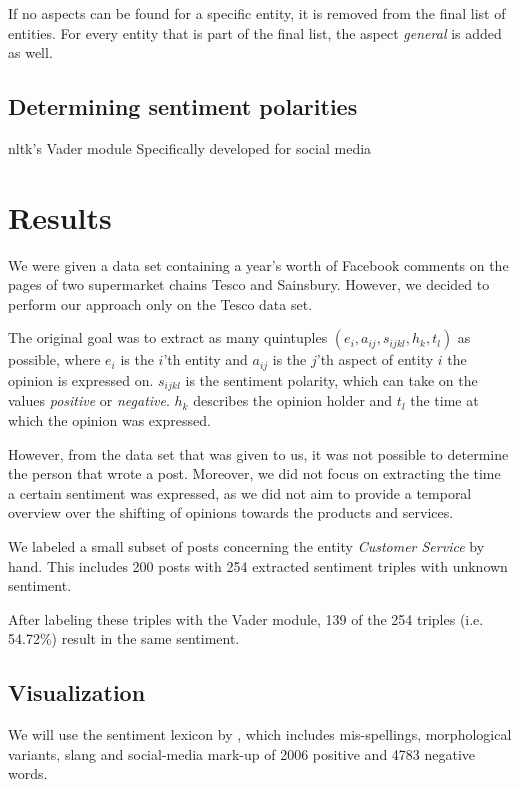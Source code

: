 \documentclass[10pt,a4paper]{article}
\begin{document}
		If no aspects can be found for a specific entity, it is removed from the final list of entities.
		For every entity that is part of the final list, the aspect \textit{general} is added as well.

		\subsection{Determining sentiment polarities}
		nltk's Vader module
		Specifically developed for social media

	\section{Results}
	\label{sec:results}
	
	
	We were given a data set containing a year's worth of Facebook comments on the pages of two supermarket chains Tesco and Sainsbury. However, we decided to perform our approach only on the Tesco data set.

	The original goal was to extract as many quintuples $(e_i, a_{ij}, s_{ijkl}, h_k, t_l)$ as possible, where $e_i$ is the $i$'th entity and $a_{ij}$ is the $j$'th aspect of entity $i$ the opinion is expressed on. $s_{ijkl}$ is the sentiment polarity, which can take on the values \textit{positive} or \textit{negative}. $h_k$ describes the opinion holder and $t_l$ the time at which the opinion was expressed.

	However, from the data set that was given to us, it was not possible to determine the person that wrote a post. Moreover, we did not focus on extracting the time a certain sentiment was expressed, as we did not aim to provide a temporal overview over the shifting of opinions towards the products and services.

	We labeled a small subset of posts concerning the entity \textit{Customer Service} by hand. This includes 200 posts with 254 extracted sentiment triples with unknown sentiment.

	After labeling these triples with the Vader module, 139 of the 254 triples (i.e. 54.72\%) result in the same sentiment.

		\subsection{Visualization}
		We will use the sentiment lexicon by \cite{Hu:2004:MSC:1014052.1014073}, which includes mis-spellings, morphological variants, slang and social-media mark-up of 2006 positive and 4783 negative words.
\end{document}
